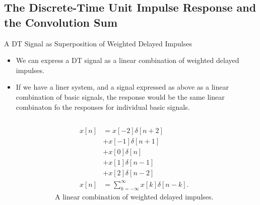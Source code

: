 \subsection{The Discrete-Time Unit Impulse Response and the Convolution Sum}

\begin{frame}{A DT Signal as  Superposition of Weighted Delayed Impulses}
    \begin{itemize}
      \item We can express a DT signal as a linear combination of weighted delayed impulses.
      \item If we have a liner system, and a signal expressed as above as a linear combination of basic signals, the response would be the same linear combinaton fo the responses for individual basic signals.
    \end{itemize}

\end{frame}


\begin{frame}[plain]
    {
        \begin{columns}
                \begin{figure}
                  \centering
                  
                  \caption{}\label{fi:dt_as_superposition}
                \end{figure}
            \pause
            \begin{align*}
              x[n] &= x[-2]\delta[n+2] \\
              &  + x[-1]\delta[n+1] \\
              &  + x[0]\delta[n] \\
              &  + x[1]\delta[n-1] \\
              &  + x[2]\delta[n-2] \\
              x[n] &= \sum_{k=-\infty}^{\infty}x[k]\delta[n-k].
            \end{align*}
            A linear combination of weighted delayed impulses.
        \end{columns}
    }
\end{frame}


